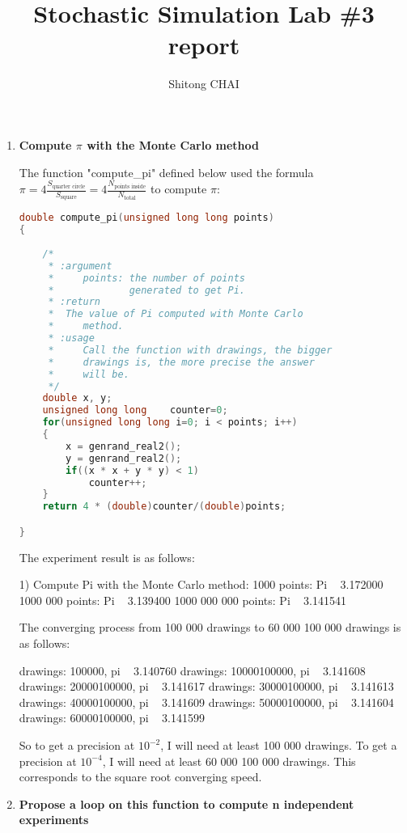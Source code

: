 \documentclass{article}
\title{Stochastic Simulation Lab \#3 report}
\author{Shitong CHAI}
\date{}
\begin{document}
\maketitle 

\begin{enumerate}
\item{\textbf{Compute $\pi$ with the Monte Carlo method }}

The function "compute\_pi" defined below used the formula $\pi = 4 \frac{S_\text{quarter circle}}{S_\text{square}} = 4 \frac{N_\text{points inside}}{N_\text{total}}$ to compute $\pi$:
\begin{lstlisting}[language=C]
double compute_pi(unsigned long long points)
{
    
    /*
     * :argument
     *     points: the number of points
     *             generated to get Pi.
     * :return
     *  The value of Pi computed with Monte Carlo 
     *     method.
     * :usage
     *     Call the function with drawings, the bigger
     *     drawings is, the more precise the answer 
     *     will be.
     */
    double x, y;
    unsigned long long    counter=0;
    for(unsigned long long i=0; i < points; i++)
    {
        x = genrand_real2();
        y = genrand_real2();
        if((x * x + y * y) < 1)
            counter++;
    }
    return 4 * (double)counter/(double)points;

}
\end{lstlisting}
The experiment result is as follows:
\begin{messageshell}
1) Compute Pi with the Monte Carlo method:
1000 points:
Pi ~ 3.172000
1000 000 points:
Pi ~ 3.139400
1000 000 000 points:
Pi ~ 3.141541
\end{messageshell}
The converging process from 100 000 drawings to 60 000 100 000 drawings is as follows:
\begin{messageshell}
drawings: 100000, pi ~ 3.140760
drawings: 10000100000, pi ~ 3.141608
drawings: 20000100000, pi ~ 3.141617
drawings: 30000100000, pi ~ 3.141613
drawings: 40000100000, pi ~ 3.141609
drawings: 50000100000, pi ~ 3.141604
drawings: 60000100000, pi ~ 3.141599
\end{messageshell}
So to get a precision at $10^{-2}$, I will need at least 100 000 drawings. To get a precision at $10^{-4}$, I will need at least 60 000 100 000 drawings. This corresponds to the square root converging speed.
\item{\textbf{Propose a loop on this function to compute n independent experiments }}


\end{enumerate}
\end{document}
